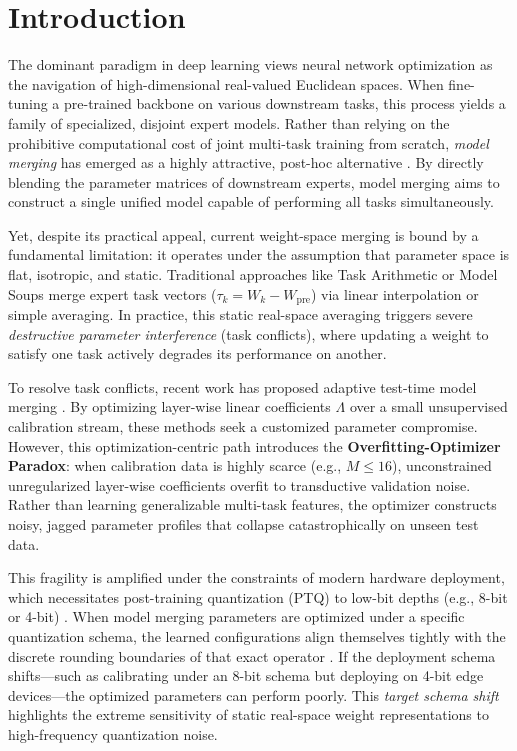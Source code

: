 \section{Introduction}
\label{sec:intro}

The dominant paradigm in deep learning views neural network optimization as the navigation of high-dimensional real-valued Euclidean spaces. When fine-tuning a pre-trained backbone on various downstream tasks, this process yields a family of specialized, disjoint expert models. Rather than relying on the prohibitive computational cost of joint multi-task training from scratch, \emph{model merging} has emerged as a highly attractive, post-hoc alternative \cite{ilharco2022editing, wortsman2022model, yadav2023ties}. By directly blending the parameter matrices of downstream experts, model merging aims to construct a single unified model capable of performing all tasks simultaneously.

Yet, despite its practical appeal, current weight-space merging is bound by a fundamental limitation: it operates under the assumption that parameter space is flat, isotropic, and static. Traditional approaches like Task Arithmetic \cite{ilharco2022editing} or Model Soups \cite{wortsman2022model} merge expert task vectors ($\tau_k = W_k - W_{\text{pre}}$) via linear interpolation or simple averaging. In practice, this static real-space averaging triggers severe \emph{destructive parameter interference} (task conflicts), where updating a weight to satisfy one task actively degrades its performance on another.

To resolve task conflicts, recent work has proposed adaptive test-time model merging \cite{yang2023adamerging, regcalmerge2024}. By optimizing layer-wise linear coefficients $\Lambda$ over a small unsupervised calibration stream, these methods seek a customized parameter compromise. However, this optimization-centric path introduces the \textbf{Overfitting-Optimizer Paradox}: when calibration data is highly scarce (e.g., $M \le 16$), unconstrained unregularized layer-wise coefficients overfit to transductive validation noise. Rather than learning generalizable multi-task features, the optimizer constructs noisy, jagged parameter profiles that collapse catastrophically on unseen test data.

This fragility is amplified under the constraints of modern hardware deployment, which necessitates post-training quantization (PTQ) to low-bit depths (e.g., 8-bit or 4-bit) \cite{frantar2022gptq, lin2023awq}. When model merging parameters are optimized under a specific quantization schema, the learned configurations align themselves tightly with the discrete rounding boundaries of that exact operator \cite{qmerge2024}. If the deployment schema shifts---such as calibrating under an 8-bit schema but deploying on 4-bit edge devices---the optimized parameters can perform poorly. This \emph{target schema shift} highlights the extreme sensitivity of static real-space weight representations to high-frequency quantization noise.

